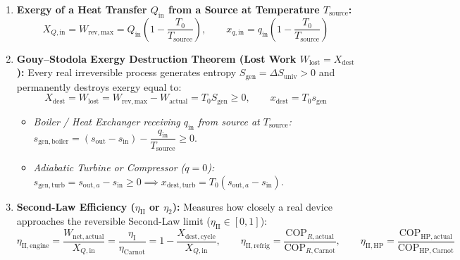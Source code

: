 \begin{formulacard}
\begin{enumerate}
  \item \textbf{Exergy of a Heat Transfer $Q_{\mathrm{in}}$ from a Source at Temperature $T_{\mathrm{source}}$:}
  \begin{equation}\label{eq:08:exergy-heat}
    \boxed{X_{Q,\mathrm{in}} = W_{\mathrm{rev,max}} = Q_{\mathrm{in}}\left(1 - \frac{T_0}{T_{\mathrm{source}}}\right)}, \qquad x_{q,\mathrm{in}} = q_{\mathrm{in}}\left(1 - \frac{T_0}{T_{\mathrm{source}}}\right)
  \end{equation}
  \item \textbf{Gouy--Stodola Exergy Destruction Theorem (Lost Work $W_{\mathrm{lost}} = X_{\mathrm{dest}}$):}
  Every real irreversible process generates entropy $S_{\mathrm{gen}} = \Delta S_{\mathrm{univ}} > 0$ and permanently destroys exergy equal to:
  \begin{equation}\label{eq:08:gouy-stodola}
    \boxed{X_{\mathrm{dest}} = W_{\mathrm{lost}} = W_{\mathrm{rev,max}} - W_{\mathrm{actual}} = T_0 S_{\mathrm{gen}} \ge 0}, \qquad \boxed{x_{\mathrm{dest}} = T_0 s_{\mathrm{gen}}}
  \end{equation}
  \begin{itemize}
    \item \emph{Boiler / Heat Exchanger receiving $q_{\mathrm{in}}$ from source at $T_{\mathrm{source}}$:} $s_{\mathrm{gen,boiler}} = (s_{\mathrm{out}} - s_{\mathrm{in}}) - \dfrac{q_{\mathrm{in}}}{T_{\mathrm{source}}} \ge 0$.
    \item \emph{Adiabatic Turbine or Compressor ($q = 0$):} $s_{\mathrm{gen,turb}} = s_{\mathrm{out},a} - s_{\mathrm{in}} \ge 0 \implies x_{\mathrm{dest,turb}} = T_0(s_{\mathrm{out},a} - s_{\mathrm{in}})$.
  \end{itemize}
  \item \textbf{Second-Law Efficiency ($\eta_{\mathrm{II}}$ or $\eta_2$):} Measures how closely a real device approaches the reversible Second-Law limit ($\eta_{\mathrm{II}} \in [0, 1]$):
  \begin{equation}\label{eq:08:eta-ii}
    \boxed{\eta_{\mathrm{II,engine}} = \frac{W_{\mathrm{net,actual}}}{X_{Q,\mathrm{in}}} = \frac{\eta_{\mathrm{I}}}{\eta_{\mathrm{Carnot}}} = 1 - \frac{X_{\mathrm{dest,cycle}}}{X_{Q,\mathrm{in}}}}, \qquad \boxed{\eta_{\mathrm{II,refrig}} = \frac{\mathrm{COP}_{R,\mathrm{actual}}}{\mathrm{COP}_{R,\mathrm{Carnot}}}}, \qquad \boxed{\eta_{\mathrm{II,HP}} = \frac{\mathrm{COP}_{\mathrm{HP,actual}}}{\mathrm{COP}_{\mathrm{HP,Carnot}}}}
  \end{equation}
\end{enumerate}
\end{formulacard}

